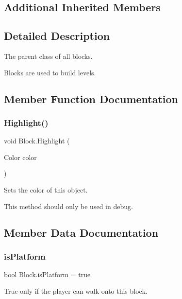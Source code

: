 \subsection*{Additional Inherited Members}


\subsection{Detailed Description}
The parent class of all blocks. 

Blocks are used to build levels. 

\subsection{Member Function Documentation}
\mbox{\label{class_block_a2a05ee429ccb968fdc5ec266b5d6b637}} 
\subsubsection{\texorpdfstring{Highlight()}{Highlight()}}
{\footnotesize\ttfamily void Block.\+Highlight (\begin{DoxyParamCaption}\item[{Color}]{color }\end{DoxyParamCaption})\hspace{0.3cm}{\ttfamily [inline]}}



Sets the color of this object. 

This method should only be used in debug. 

\subsection{Member Data Documentation}
\mbox{\label{class_block_ab00076784ce640640411d2cb40bbb7ab}} 
\subsubsection{\texorpdfstring{is\+Platform}{isPlatform}}
{\footnotesize\ttfamily bool Block.\+is\+Platform = true}



True only if the player can walk onto this block. 

